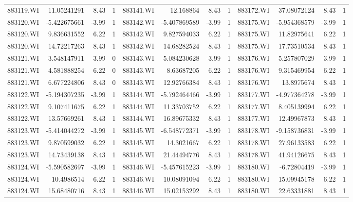 \documentclass{sysuthesis}
\begin{document}
\begin{table}[htbp]
{\begin{tabular}{rrrrrrrrrrrr}
    883119.WI & 11.05241291 & 8.43  & 1     & 883141.WI & 12.168864 & 8.43  & 1     & 883172.WI & 37.08072124 & 8.43  & 1 \\
    883120.WI & -5.422675661 & -3.99 & 1     & 883142.WI & -5.407869589 & -3.99 & 1     & 883175.WI & -5.954368579 & -3.99 & 1 \\
    883120.WI & 9.836631552 & 6.22  & 1     & 883142.WI & 9.827594033 & 6.22  & 1     & 883175.WI & 11.82975641 & 6.22  & 1 \\
    883120.WI & 14.72217263 & 8.43  & 1     & 883142.WI & 14.68282524 & 8.43  & 1     & 883175.WI & 17.73510534 & 8.43  & 1 \\
    883121.WI & -3.548147911 & -3.99 & 0     & 883143.WI & -5.084230628 & -3.99 & 1     & 883176.WI & -5.257807029 & -3.99 & 1 \\
    883121.WI & 4.581888254 & 6.22  & 0     & 883143.WI & 8.63687205 & 6.22  & 1     & 883176.WI & 9.315469954 & 6.22  & 1 \\
    883121.WI & 6.677224806 & 8.43  & 0     & 883143.WI & 12.92766384 & 8.43  & 1     & 883176.WI & 13.8975674 & 8.43  & 1 \\
    883122.WI & -5.194307235 & -3.99 & 1     & 883144.WI & -5.792464466 & -3.99 & 1     & 883177.WI & -4.977364278 & -3.99 & 1 \\
    883122.WI & 9.107411675 & 6.22  & 1     & 883144.WI & 11.33703752 & 6.22  & 1     & 883177.WI & 8.405139994 & 6.22  & 1 \\
    883122.WI & 13.57669261 & 8.43  & 1     & 883144.WI & 16.89675332 & 8.43  & 1     & 883177.WI & 12.49967873 & 8.43  & 1 \\
    883123.WI & -5.414044272 & -3.99 & 1     & 883145.WI & -6.548772371 & -3.99 & 1     & 883178.WI & -9.158736831 & -3.99 & 1 \\
    883123.WI & 9.870599032 & 6.22  & 1     & 883145.WI & 14.3021667 & 6.22  & 1     & 883178.WI & 27.96133583 & 6.22  & 1 \\
    883123.WI & 14.73439138 & 8.43  & 1     & 883145.WI & 21.44494776 & 8.43  & 1     & 883178.WI & 41.94126675 & 8.43  & 1 \\
    883124.WI & -5.590582697 & -3.99 & 1     & 883146.WI & -5.457615223 & -3.99 & 1     & 883180.WI & -6.72804419 & -3.99 & 1 \\
    883124.WI & 10.4986514 & 6.22  & 1     & 883146.WI & 10.08091094 & 6.22  & 1     & 883180.WI & 15.09945178 & 6.22  & 1 \\
    883124.WI & 15.68480716 & 8.43  & 1     & 883146.WI & 15.02153292 & 8.43  & 1     & 883180.WI & 22.63331881 & 8.43  & 1 \\

\end{tabular}}
\end{table}
\end{document}
